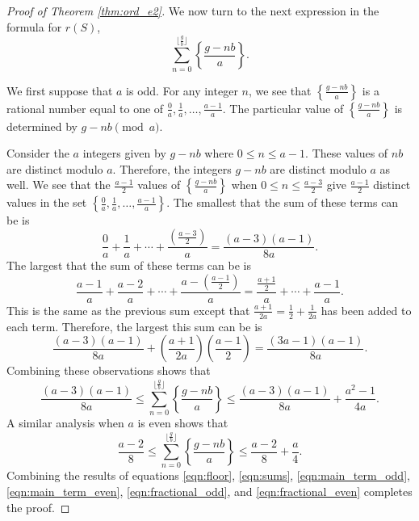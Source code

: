 \documentclass[10pt,a4paper]{amsart}
\begin{document}
\begin{proof}[Proof of Theorem \ref{thm:ord_e2}]
We now turn to the next expression in the formula for $r(S)$,
\[
\sum_{n=0}^{\lfloor\frac{g}{b}\rfloor} \left\{\frac{g-nb}{a} \right\}.
\]

We first suppose that $a$ is odd. For any integer $n$, we see that $\left\{\frac{g-nb}{a}\right\}$ is a rational number equal to one of $\frac{0}{a},\frac{1}{a},\ldots, \frac{a-1}{a}$. The particular value of $\left\{\frac{g-nb}{a}\right\}$ is determined by $g-nb \pmod{a}$.

Consider the $a$ integers given by $g-nb$ where $0 \le n \le a-1$.  These values of $nb$ are distinct modulo $a$. Therefore, the integers $g-nb$ are distinct modulo $a$ as well.  We see that the $\frac{a-1}{2}$ values of $\left\{\frac{g-nb}{a}\right\}$ when $0 \le n \le \frac{a-3}{2}$ give $\frac{a-1}{2}$ distinct values in the set $\left\{\frac{0}{a},\frac{1}{a},\ldots, \frac{a-1}{a}\right\}$.  The smallest that the sum of these terms can be is 
\[
\frac{0}{a} + \frac{1}{a} + \cdots + \frac{\left(\frac{a-3}{2}\right)}{a} = \frac{(a-3)(a-1)}{8a}.
\]
The largest that the sum of these terms can be is 
\[
\frac{a-1}{a} + \frac{a-2}{a} + \cdots + \frac{a-\left(\frac{a-1}{2}\right)}{a} = 
\frac{\frac{a+1}{2}}{a}+ \cdots + \frac{a-1}{a}.
\]
This is the same as the previous sum except that $\frac{a+1}{2a} = \frac{1}{2} + \frac{1}{2a}$ has been added to each term.  Therefore,  the largest this sum can be is 
\[
\frac{(a-3)(a-1)}{8a} + \left(\frac{a+1}{2a}\right) \left( \frac{a-1}{2}\right) = \frac{(3a-1)(a-1)}{8a}.
\]
Combining these observations shows that 
\begin{equation}\label{eqn:fractional_odd}
 \frac{(a-3)(a-1)}{8a} \le \sum_{n=0}^{\lfloor\frac{g}{b}\rfloor} \left\{\frac{g-nb}{a} \right\} \le  \frac{(a-3)(a-1)}{8a} + \frac{a^2-1}{4a}.
\end{equation}
A similar analysis when $a$ is even shows that
\begin{equation}\label{eqn:fractional_even}
\frac{a-2}{8} \le \sum_{n=0}^{\lfloor\frac{g}{b}\rfloor} \left\{\frac{g-nb}{a} \right\} \le \frac{a-2}{8} + \frac{a}{4}.
\end{equation}
Combining the results of equations \eqref{eqn:floor}, \eqref{eqn:sums}, \eqref{eqn:main_term_odd}, \eqref{eqn:main_term_even}, \eqref{eqn:fractional_odd}, and \eqref{eqn:fractional_even} completes the proof.
\end{proof}
\end{document}
